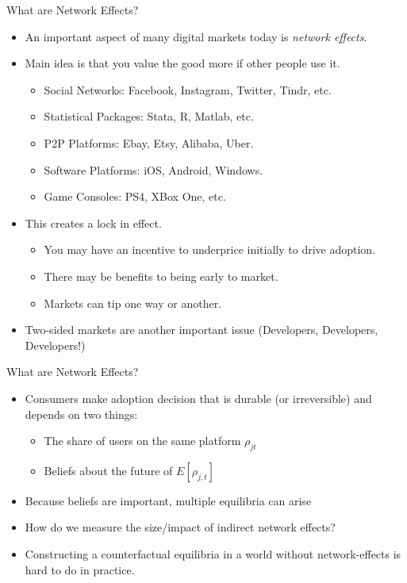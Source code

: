 \documentclass[xcolor=pdftex,dvipsnames,table,mathserif]{beamer}
\begin{document}
\begin{frame}{What are Network Effects?}
\begin{itemize}
\item An important aspect of many digital markets today is \textit{network effects}.
\item Main idea is that you value the good more if other people use it.
\begin{itemize}
\item Social Networks: Facebook, Instagram, Twitter, Tindr, etc.
\item Statistical Packages: Stata, R, Matlab, etc.
\item P2P Platforms: Ebay, Etsy, Alibaba, Uber.
\item Software Platforms: iOS, Android, Windows.
\item Game Consoles: PS4, XBox One, etc.
\end{itemize}
\item This creates a \alert{lock in} effect.
\begin{itemize}
\item You may have an incentive to underprice initially to drive adoption.
\item There may be benefits to being early to market.
\item Markets can \alert{tip} one way or another.
\end{itemize}
\item Two-sided markets are another important issue (Developers, Developers, Developers!) 
\end{itemize}
\end{frame}


\begin{frame}{What are Network Effects?}
\begin{itemize}
\item Consumers make adoption decision that is durable (or irreversible) and depends on two things:
\begin{itemize}
\item The share of users on the same platform $\rho_{jt}$
\item Beliefs about the future of $E[\rho_{j,t}]$
\end{itemize}
\item Because beliefs are important, multiple equilibria can arise
\item How do we measure the size/impact of indirect network effects?
\item Constructing a counterfactual equilibria in a world without network-effects is hard to do in practice.
\end{itemize}
\end{frame}
\end{document}
